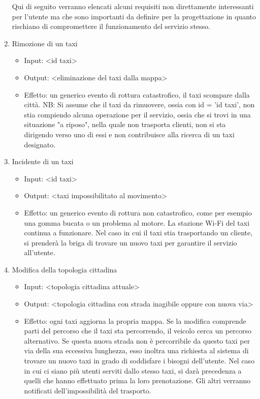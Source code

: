 \begin{enumerate}
	Qui di seguito verranno elencati alcuni requisiti non direttamente interessanti per l'utente ma che sono importanti da definire per la progettazione in quanto rischiano di compromettere il funzionamento del servizio stesso.
	
	\item Rimozione di un taxi
		\begin{itemize}
			\item Input: <id taxi>
			\item Output: <eliminazione del taxi dalla mappa>
			\item Effetto: un generico evento di rottura catastrofico, il taxi scompare dalla città. NB: Si assume che il taxi da rimuovere, ossia con id = 'id taxi', non stia compiendo alcuna operazione per il servizio, ossia che si trovi in una situazione "a riposo", nella quale non trasporta clienti, non si sta dirigendo verso uno di essi e non contribuisce alla ricerca di un taxi designato.
		\end{itemize}
	
	\item Incidente di un taxi
	\begin{itemize}
		\item Input: <id taxi>
		\item Output: <taxi impossibilitato al movimento>
		\item Effetto: un generico evento di rottura non catastrofico, come per esempio una gomma bucata o un problema al motore. La stazione Wi-Fi del taxi continua a funzionare. Nel caso in cui il taxi stia trasportando un cliente, si prenderà la briga di trovare un nuovo taxi per garantire il servizio all'utente.
	\end{itemize}

	\item Modifica della topologia cittadina
		\begin{itemize}
			\item Input: <topologia cittadina attuale>
			\item Output: <topologia cittadina con strada inagibile oppure con nuova via>
			\item Effetto: ogni taxi aggiorna la propria mappa. Se la modifica comprende parti del percorso che il taxi sta percorrendo, il veicolo cerca un percorso alternativo. Se questa nuova strada non è percorribile da questo taxi per via della sua eccessiva lunghezza, esso inoltra una richiesta al sistema di trovare un nuovo taxi in grado di soddisfare i bisogni dell'utente. Nel caso in cui ci siano più utenti serviti dallo stesso taxi, si darà precedenza a quelli che hanno effettuato prima la loro prenotazione. Gli altri verranno notificati dell'impossibilità del trasporto.
		\end{itemize}

\end{enumerate}

